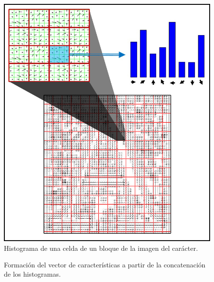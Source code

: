 		\begin{figure}[htbp]
			\centering
			\centerline{ \includegraphics[scale=0.5]{img/letter_A_histogram_inv.jpg} }
			\caption[Histograma de una celda]{Histograma de una celda de un bloque de la imagen del carácter.}
			\label{fig: Histograma de Celda}
		\end{figure}
		
		\begin{figure}[htbp]
			\centering
			\caption[Vector HOG]{Formación del vector de características a partir de la concatenación de los histogramas.}
			\label{fig: Vector HOG}
		\end{figure}
